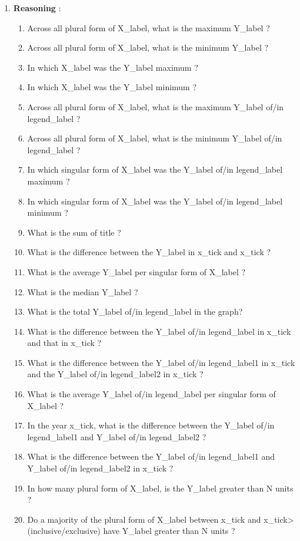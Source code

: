\documentclass[10pt,twocolumn,letterpaper]{article}
\begin{document}
\begin{enumerate}
    \item \textbf{Reasoning} :
    \begin{enumerate}[1.]
        \item Across all plural form of X\_label, what is the maximum Y\_label ?
        \item Across all plural form of X\_label, what is the minimum Y\_label ?
        \item In which X\_label was the Y\_label maximum ?
        \item In which X\_label was the Y\_label minimum ?
        \item Across all plural form of X\_label, what is the maximum Y\_label of/in legend\_label ?
        \item Across all plural form of X\_label, what is the minimum Y\_label of/in legend\_label ?
        \item In which singular form of X\_label was the Y\_label of/in legend\_label maximum ?
        \item In which singular form of X\_label was the Y\_label of/in legend\_label minimum ?
        \item What is the sum of title ?
        \item What is the difference between the Y\_label in x\_tick and x\_tick ?
        \item What is the average Y\_label per singular form of X\_label ?
        \item What is the median Y\_label ?
        \item What is the total Y\_label of/in legend\_label in the graph?
        \item What is the difference between the Y\_label of/in legend\_label in x\_tick and that in x\_tick ?
        \item What is the difference between the Y\_label of/in legend\_label1 in x\_tick and the Y\_label of/in legend\_label2 in x\_tick ?
        \item What is the average Y\_label of/in legend\_label per singular form of X\_label ?
        \item In the year x\_tick, what is the difference between the Y\_label of/in legend\_label1 and Y\_label of/in legend\_label2 ?
        \item What is the difference between the Y\_label of/in legend\_label1 and Y\_label of/in legend\_label2 in x\_tick ?
        \item In how many plural form of X\_label, is the Y\_label greater than N units ?
        \item Do a majority of the plural form of X\_label between  x\_tick and  x\_tick> (inclusive/exclusive)  have Y\_label greater than N units ?

\end{enumerate}
\end{enumerate}
\end{document}
